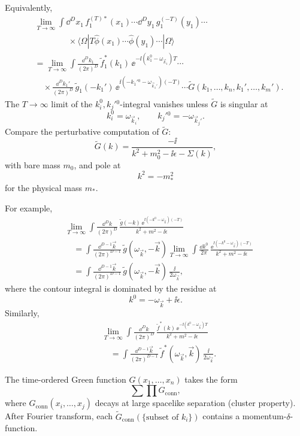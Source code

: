 Equivalently,
\[
\begin{aligned}
&\lim_{T\to\infty}
  \int \dd^Dx_1\,f_1^{(T)*}(x_1)\cdots
  \dd^Dy_1\,g_1^{(-T)}(y_1)\cdots
\\
&\qquad\qquad\times
  \langle\Omega|T\hat\phi(x_1)\cdots\hat\phi(y_1)\cdots|\Omega\rangle
\\
&=
  \lim_{T\to\infty}
  \int
  \frac{\dd^Dk_1}{(2\pi)^D}\,
  \widetilde f_1^*(k_1)\,
  \ee^{-\ii(k_1^0-\omega_{\vec k_1})T}\cdots
\\
&\quad\times
  \frac{\dd^Dk_1'}{(2\pi)^D}\,
  \widetilde g_1(-k_1')\,
  \ee^{\ii(-k_1'{}^0-\omega_{\vec k_1'})(-T)}\cdots
  \widetilde G(k_1,\ldots,k_n,k_1',\ldots,k_m') .
\end{aligned}
\]
The \(T\to\infty\) limit of the \(k_i^0,k_j'{}^0\)-integral vanishes unless
\(\widetilde G\) is singular at
\[
  k_i^0=\omega_{\vec k_i},
  \qquad
  k_j'{}^0=-\omega_{\vec k_j'} .
\]
Compare the perturbative computation of \(\widetilde G\):
\[
  \widetilde G(k)
  =
  \frac{-\ii}{k^2+m_0^2-\ii\epsilon-\Sigma(k)} ,
\]
with bare mass \(m_0\), and pole at
\[
  k^2=-m_*^2
\]
for the physical mass \(m_*\).

For example,
\[
\begin{aligned}
&\lim_{T\to\infty}
  \int\frac{\dd^Dk}{(2\pi)^D}\,
  \frac{\widetilde g(-k)\,
  \ee^{\ii(-k^0-\omega_{\vec k})(-T)}}{k^2+m^2-\ii\epsilon}
\\
&\quad =
  \int\frac{\dd^{D-1}\vec k}{(2\pi)^{D-1}}\,
  \widetilde g(\omega_{\vec k},-\vec k)
  \lim_{T\to\infty}
  \int\frac{\dd k^0}{2\pi}\,
  \frac{\ee^{\ii(-k^0-\omega_{\vec k})(-T)}}{k^2+m^2-\ii\epsilon}
\\
&\quad =
  \int\frac{\dd^{D-1}\vec k}{(2\pi)^{D-1}}\,
  \widetilde g(\omega_{\vec k},-\vec k)\,
  \frac{\ii}{2\omega_{\vec k}},
\end{aligned}
\]
where the contour integral is dominated by the residue at
\[
  k^0=-\omega_{\vec k}+\ii\epsilon .
\]
Similarly,
\[
\begin{aligned}
&\lim_{T\to\infty}
  \int\frac{\dd^Dk}{(2\pi)^D}\,
  \frac{\widetilde f^*(k)\,
  \ee^{-\ii(k^0-\omega_{\vec k})T}}{k^2+m^2-\ii\epsilon}
\\
&\quad =
  \int\frac{\dd^{D-1}\vec k}{(2\pi)^{D-1}}\,
  \widetilde f^*(\omega_{\vec k},\vec k)\,
  \frac{\ii}{2\omega_{\vec k}} .
\end{aligned}
\]

The time-ordered Green function \(G(x_1,\ldots,x_n)\) takes the form
\[
  \sum \prod G_{\mathrm{conn}},
\]
where \(G_{\mathrm{conn}}(x_i,\ldots,x_j)\) decays at large spacelike
separation (cluster property). After Fourier transform, each
\(\widetilde G_{\mathrm{conn}}(\{\text{subset of }k_i\})\) contains a
momentum-\(\delta\)-function.

